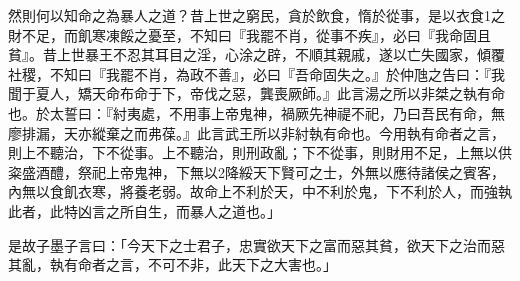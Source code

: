 \begin{pinyinscope}
然則何以知命之為暴人之道？昔上世之窮民，貪於飲食，惰於從事，是以衣食1之財不足，而飢寒凍餒之憂至，不知曰『我罷不肖，從事不疾』，必曰『我命固且貧』。昔上世暴王不忍其耳目之淫，心涂之辟，不順其親戚，遂以亡失國家，傾覆社稷，不知曰『我罷不肖，為政不善』，必曰『吾命固失之。』於仲虺之告曰：『我聞于夏人，矯天命布命于下，帝伐之惡，龔喪厥師。』此言湯之所以非桀之執有命也。於太誓曰：『紂夷處，不用事上帝鬼神，禍厥先神禔不祀，乃曰吾民有命，無廖排漏，天亦縱棄之而弗葆。』此言武王所以非紂執有命也。今用執有命者之言，則上不聽治，下不從事。上不聽治，則刑政亂；下不從事，則財用不足，上無以供粢盛酒醴，祭祀上帝鬼神，下無以2降綏天下賢可之士，外無以應待諸侯之賓客，內無以食飢衣寒，將養老弱。故命上不利於天，中不利於鬼，下不利於人，而強執此者，此特凶言之所自生，而暴人之道也。」

是故子墨子言曰：「今天下之士君子，忠實欲天下之富而惡其貧，欲天下之治而惡其亂，執有命者之言，不可不非，此天下之大害也。」


\end{pinyinscope}